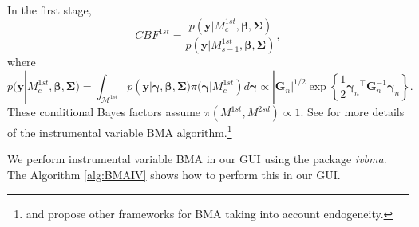 In the first stage,
\begin{equation*}
	CBF^{1st}=\frac{p(\bm{y}|M_{c}^{1st},\bm{\beta},\bm{\Sigma})}{p(\bm{y}|M_{s-1}^{1st},\bm{\beta},\bm{\Sigma})},
\end{equation*}
where \begin{equation*}
	p(\bm{y}|M_{c}^{1st},\bm{\beta},\bm{\Sigma})=\int_{\mathcal{M}^{1st}}p(\bm{y}|\bm{\gamma},\bm{\beta},\bm{\Sigma})\pi(\bm{\gamma}|M_{c}^{1st})d\bm{\gamma}\propto |\bm{G}_n|^{1/2} \exp\left\{\frac{1}{2}{\bm{\gamma}_n}^{\top}\bm{G}_n^{-1}\bm{\gamma}_n\right\}.
\end{equation*}
These conditional Bayes factors assume $\pi(M^{1st},M^{2sd})\propto 1$. See \cite{Lenkoski2013} for more details of the instrumental variable BMA algorithm.\footnote{\cite{Koop12} and \cite{Lenkoski2014} propose other frameworks for BMA taking into account endogeneity.}

We perform instrumental variable BMA in our GUI using the package \textit{ivbma}. The Algorithm \ref{alg:BMAIV} shows how to perform this in our GUI. 

